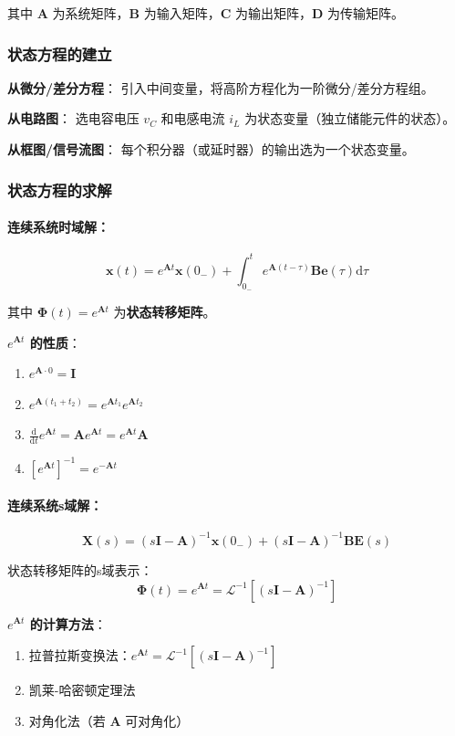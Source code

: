 \documentclass[11pt,a4paper]{ctexart}
\newcommand{\LT}{\mathcal{L}}           %
\newcommand{\dd}{\mathrm{d}}            %
\begin{document}
其中 $\mathbf{A}$ 为系统矩阵，$\mathbf{B}$ 为输入矩阵，$\mathbf{C}$ 为输出矩阵，$\mathbf{D}$ 为传输矩阵。

\subsubsection{状态方程的建立}

\textbf{从微分/差分方程}：
引入中间变量，将高阶方程化为一阶微分/差分方程组。

\textbf{从电路图}：
选电容电压 $v_C$ 和电感电流 $i_L$ 为状态变量（独立储能元件的状态）。

\textbf{从框图/信号流图}：
每个积分器（或延时器）的输出选为一个状态变量。

\subsubsection{状态方程的求解}

\paragraph{连续系统时域解：}
\[
\boxed{\mathbf{x}(t) = e^{\mathbf{A}t}\mathbf{x}(0_-) + \int_{0_-}^{t} e^{\mathbf{A}(t-\tau)}\mathbf{B}\mathbf{e}(\tau)\dd\tau}
\]

其中 $\boldsymbol{\Phi}(t) = e^{\mathbf{A}t}$ 为\textbf{状态转移矩阵}。

\textbf{$e^{\mathbf{A}t}$ 的性质}：
\begin{enumerate}
    \item $e^{\mathbf{A}\cdot 0} = \mathbf{I}$
    \item $e^{\mathbf{A}(t_1+t_2)} = e^{\mathbf{A}t_1}e^{\mathbf{A}t_2}$
    \item $\frac{\dd}{\dd t}e^{\mathbf{A}t} = \mathbf{A}e^{\mathbf{A}t} = e^{\mathbf{A}t}\mathbf{A}$
    \item $[e^{\mathbf{A}t}]^{-1} = e^{-\mathbf{A}t}$
\end{enumerate}

\paragraph{连续系统s域解：}
\[
\boxed{\mathbf{X}(s) = (s\mathbf{I} - \mathbf{A})^{-1}\mathbf{x}(0_-) + (s\mathbf{I} - \mathbf{A})^{-1}\mathbf{B}\mathbf{E}(s)}
\]

状态转移矩阵的s域表示：
\[
\boldsymbol{\Phi}(t) = e^{\mathbf{A}t} = \LT^{-1}[(s\mathbf{I} - \mathbf{A})^{-1}]
\]

\textbf{$e^{\mathbf{A}t}$ 的计算方法}：
\begin{enumerate}
    \item 拉普拉斯变换法：$e^{\mathbf{A}t} = \LT^{-1}[(s\mathbf{I} - \mathbf{A})^{-1}]$
    \item 凯莱-哈密顿定理法
    \item 对角化法（若 $\mathbf{A}$ 可对角化）
\end{enumerate}
\end{document}

